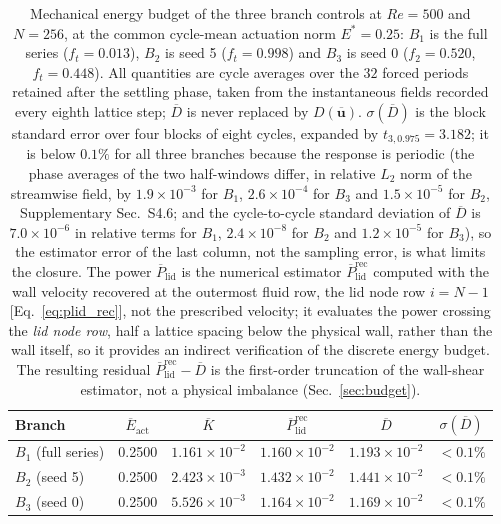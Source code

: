 \documentclass[11pt,a4paper]{article}
\newcommand{\Dbar}{\overline{D}}
\newenvironment{chgadd}{\par\color{blue}}{\par\color{black}}
\begin{document}
\begin{chgadd}
\begin{table}[t]
\centering
\caption{Mechanical energy budget of the three branch controls at $Re=500$ and
$N=256$, at the common cycle-mean actuation norm $E^\ast=0.25$: $B_1$ is the full
series ($f_t=0.013$), $B_2$ is seed 5 ($f_t=0.998$) and $B_3$ is seed 0
($f_2=0.520$, $f_t=0.448$). All quantities are cycle averages over the $32$ forced
periods retained after the settling phase, taken from the instantaneous fields
recorded every eighth lattice step; $\Dbar$ is never replaced by
$D(\overline{\mathbf{u}})$. $\sigma(\Dbar)$ is the block standard error over four
blocks of eight cycles, expanded by $t_{3,0.975}=3.182$; it is below $0.1\%$ for
all three branches because the response is periodic (the phase averages of the two
half-windows differ, in relative $L_2$ norm of the streamwise field, by
$1.9\times10^{-3}$ for $B_1$, $2.6\times10^{-4}$ for $B_3$ and $1.5\times10^{-5}$
for $B_2$, Supplementary Sec.~S4.6; and the
cycle-to-cycle standard deviation of $\Dbar$ is $7.0\times10^{-6}$ in relative
terms for $B_1$, $2.4\times10^{-8}$ for $B_2$ and $1.2\times10^{-5}$ for $B_3$),
so the estimator error of the last column, not the sampling error, is what limits
the closure. The power $\overline{P}_{\mathrm{lid}}$ is the numerical estimator
$\overline{P}_{\mathrm{lid}}^{\mathrm{rec}}$ computed with the
wall velocity recovered at the outermost fluid row, the lid node row
$i=N-1$ [Eq.~\eqref{eq:plid_rec}], not the
prescribed velocity; it evaluates the power crossing the \emph{lid node row},
half a lattice spacing below the physical wall, rather than the wall itself, so it
provides an indirect verification of the discrete energy budget. The resulting residual
$\overline{P}_{\mathrm{lid}}^{\mathrm{rec}}-\Dbar$ is the first-order truncation of the wall-shear
estimator, not a physical imbalance (Sec.~\ref{sec:budget}).}
\label{tab:budget}
\small
\begin{tabular}{lccccc}
\toprule
Branch & $\overline{E}_{\mathrm{act}}$ & $\overline{K}$ & $\overline{P}_{\mathrm{lid}}^{\mathrm{rec}}$
& $\Dbar$ & $\sigma(\Dbar)$\\
\midrule
$B_1$ (full series) & 0.2500 & $1.161\times10^{-2}$ & $1.160\times10^{-2}$ & $1.193\times10^{-2}$ & $<0.1\%$\\
$B_2$ (seed 5) & 0.2500 & $2.423\times10^{-3}$ & $1.432\times10^{-2}$ & $1.441\times10^{-2}$ & $<0.1\%$\\
$B_3$ (seed 0) & 0.2500 & $5.526\times10^{-3}$ & $1.164\times10^{-2}$ & $1.169\times10^{-2}$ & $<0.1\%$\\
\bottomrule
\end{tabular}
\end{table}


\end{chgadd}
\end{document}
